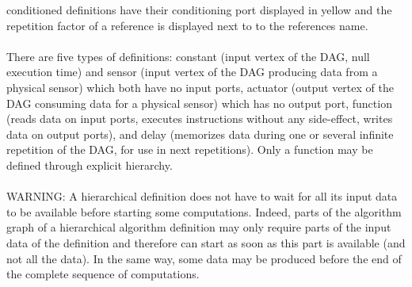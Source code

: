 \documentclass[11pt,twoside]{report}
\begin{document}
conditioned definitions have their conditioning port displayed in
yellow and the repetition factor of a reference is displayed next to
to the references name.\\\\
There are five types of definitions: constant (input vertex of the
DAG, null execution time) and sensor (input vertex of the DAG
producing data from a physical sensor) which both have no input ports,
actuator (output vertex of the DAG consuming data for a physical
sensor) which has no output port, function (reads data on input ports,
executes instructions without any side-effect, writes data on output
ports), and delay (memorizes data during one or several infinite
repetition of the DAG, for use in next repetitions). Only a function
may be defined through explicit hierarchy.\\\\
WARNING: A hierarchical definition does not have to wait for all its
input data to be available before starting some computations. Indeed,
parts of the algorithm graph of a hierarchical algorithm definition
may only require parts of the input data of the definition and
therefore can start as soon as this part is available (and not all the
data). In the same way, some data may be produced before the end of
the complete sequence of
computations.\\\\
\end{document}
